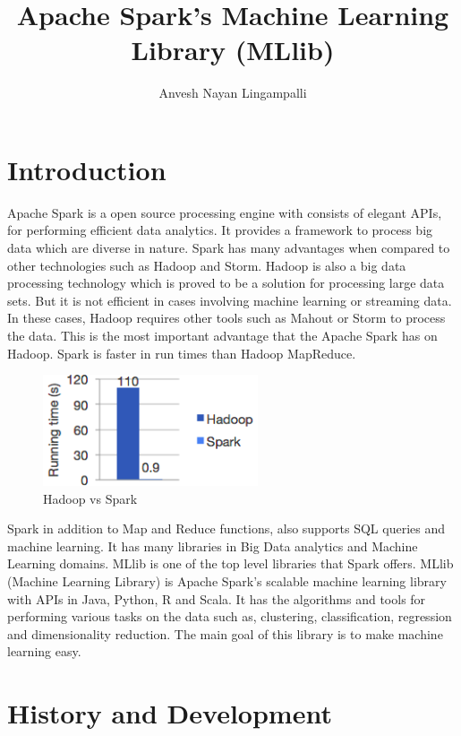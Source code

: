 \documentclass[9pt,twocolumn,twoside]{../../styles/osajnl}
\title{Apache Spark's Machine Learning Library (MLlib)}
\author[1]{Anvesh Nayan Lingampalli}
\affil[1]{School of Informatics and Computing, Bloomington, IN 47408, U.S.A.}
\affil[*]{Corresponding authors: anveling@umail.iu.edu}
\begin{document}
\maketitle

\section{Introduction}

Apache Spark is a open source processing engine with consists of
elegant APIs, for performing efficient data analytics. It provides a
framework to process big data which are diverse in nature. Spark has
many advantages when compared to other technologies such as Hadoop and
Storm. Hadoop is also a big data processing technology which is proved
to be a solution for processing large data sets. But it is not
efficient in cases involving machine learning or streaming data. In
these cases, Hadoop requires other tools such as Mahout or Storm to
process the data. This is the most important advantage that the Apache
Spark has on Hadoop. Spark is faster in run times than Hadoop
MapReduce.\cite{MLlib-webpage}

\begin{figure}[htbp]
\begin{center}
\centering
\includegraphics[width= 2.5in]{images/hadoopvspark}
\caption{Hadoop vs Spark}
\label{fig:false-color}
\end{center}
\end{figure}

Spark in addition to Map and Reduce functions, also supports SQL
queries and machine learning. It has many libraries in Big Data
analytics and Machine Learning domains. MLlib is one of the top level
libraries that Spark offers.  MLlib (Machine Learning Library) is
Apache Spark’s scalable machine learning library with APIs in Java,
Python, R and Scala. It has the algorithms and tools for performing
various tasks on the data such as, clustering, classification,
regression and dimensionality reduction. The main goal of this library
is to make machine learning easy.

\section{History and Development}
\end{document}

